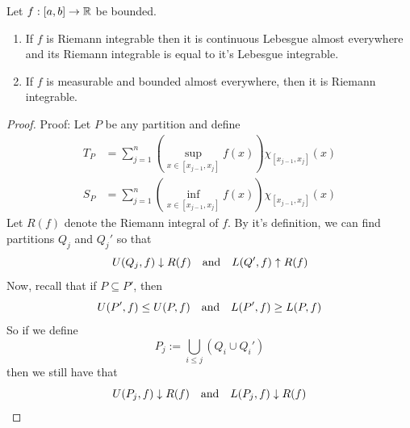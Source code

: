 \begin{theorem}
    Let $f : [a, b] \to \mathbb{R}$ be bounded. 
    \begin{enumerate}
        \item If $f$ is Riemann integrable then it is continuous Lebesgue almost everywhere and its Riemann integrable is equal to it's Lebesgue integrable.
        \item If $f$ is measurable and bounded almost everywhere, then it is Riemann integrable.
    \end{enumerate}
\end{theorem}
\begin{proof}{Proof:}
    Let $P$ be any partition and define
    \begin{align*}
        T_{P} &= \sum_{j = 1}^{n} \left(\sup_{x \in [x_{j - 1}, x_{j}]} f(x)\right) \chi_{[x_{j - 1}, x_{j}]}(x) \\
        S_{P} &= \sum_{j = 1}^{n} \left(\inf_{x \in [x_{j - 1}, x_{j}]} f(x)\right) \chi_{[x_{j - 1}, x_{j}]}(x)
    \end{align*}
    Let $R(f)$ denote the Riemann integral of $f$. By it's definition, we can find partitions $Q_j$ and $Q_j'$ so that
    \[ U(Q_j, f) \downarrow R(f) \quad \text{and} \quad L(Q', f) \uparrow R(f) \]
    Now, recall that if $P \subseteq P'$, then
    \[ U(P', f) \leq U(P, f) \quad \text{and} \quad L(P', f) \geq L(P, f) \]
    So if we define
    \[ P_{j} := \bigcup_{i \leq j} (Q_i \cup Q_{i}') \]
    then we still have that
    \[ U(P_j, f) \downarrow R(f) \quad \text{and} \quad L(P_j, f) \downarrow R(f) \]
\end{proof}